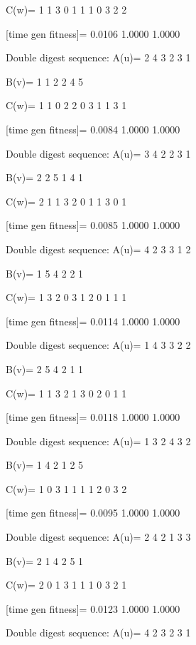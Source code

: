 C(w)=
     1     1     3     0     1     1     1     0     3     2     2

[time gen fitness]=
    0.0106    1.0000    1.0000

Double digest sequence:
A(u)=
     2     4     3     2     3     1

B(v)=
     1     1     2     2     4     5

C(w)=
     1     1     0     2     2     0     3     1     1     3     1

[time gen fitness]=
    0.0084    1.0000    1.0000

Double digest sequence:
A(u)=
     3     4     2     2     3     1

B(v)=
     2     2     5     1     4     1

C(w)=
     2     1     1     3     2     0     1     1     3     0     1

[time gen fitness]=
    0.0085    1.0000    1.0000

Double digest sequence:
A(u)=
     4     2     3     3     1     2

B(v)=
     1     5     4     2     2     1

C(w)=
     1     3     2     0     3     1     2     0     1     1     1

[time gen fitness]=
    0.0114    1.0000    1.0000

Double digest sequence:
A(u)=
     1     4     3     3     2     2

B(v)=
     2     5     4     2     1     1

C(w)=
     1     1     3     2     1     3     0     2     0     1     1

[time gen fitness]=
    0.0118    1.0000    1.0000

Double digest sequence:
A(u)=
     1     3     2     4     3     2

B(v)=
     1     4     2     1     2     5

C(w)=
     1     0     3     1     1     1     1     2     0     3     2

[time gen fitness]=
    0.0095    1.0000    1.0000

Double digest sequence:
A(u)=
     2     4     2     1     3     3

B(v)=
     2     1     4     2     5     1

C(w)=
     2     0     1     3     1     1     1     0     3     2     1

[time gen fitness]=
    0.0123    1.0000    1.0000

Double digest sequence:
A(u)=
     4     2     3     2     3     1

